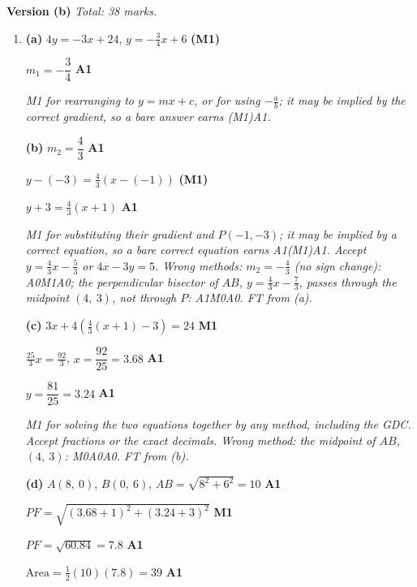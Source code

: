 \documentclass[12pt, twoside]{article}
\begin{document}
\newpage

\textbf{\large Version (b)} \hfill \emph{Total: 38 marks.}

\begin{enumerate}[itemsep=0.3cm]

\item[1.] [Maximum mark: 12]

\textbf{(a)} $4y = -3x + 24$, \quad $y = -\frac{3}{4}x + 6$ \hfill \textbf{(M1)}

$m_{1} = -\dfrac{3}{4}$ \hfill \textbf{A1}

\emph{M1 for rearranging to $y = mx + c$, or for using $-\frac{a}{b}$; it
may be implied by the correct gradient, so a bare answer earns (M1)A1.}

\textbf{(b)} $m_{2} = \dfrac{4}{3}$ \hfill \textbf{A1}

$y - (-3) = \frac{4}{3}\left(x - (-1)\right)$ \hfill \textbf{(M1)}

$y + 3 = \frac{4}{3}(x + 1)$ \hfill \textbf{A1}

\emph{M1 for substituting their gradient and $P(-1, -3)$; it may be
implied by a correct equation, so a bare correct equation earns
A1(M1)A1. Accept $y = \frac{4}{3}x - \frac{5}{3}$ or $4x - 3y = 5$. Wrong
methods: $m_{2} = -\frac{4}{3}$ (no sign change): A0M1A0; the perpendicular
bisector of $AB$, $y = \frac{4}{3}x - \frac{7}{3}$, passes through the
midpoint $(4,\ 3)$, not through $P$: A1M0A0. FT from (a).}

\textbf{(c)} $3x + 4\left(\frac{4}{3}(x + 1) - 3\right) = 24$ \hfill \textbf{M1}

$\frac{25}{3}x = \frac{92}{3}$, \quad $x = \dfrac{92}{25} = 3.68$ \hfill \textbf{A1}

$y = \dfrac{81}{25} = 3.24$ \hfill \textbf{A1}

\emph{M1 for solving the two equations together by any method, including
the GDC. Accept fractions or the exact decimals. Wrong method: the midpoint
of $AB$, $(4,\ 3)$: M0A0A0. FT from (b).}

\textbf{(d)} $A(8,\ 0)$, $B(0,\ 6)$, \quad $AB = \sqrt{8^{2} + 6^{2}} = 10$ \hfill \textbf{A1}

$PF = \sqrt{(3.68 + 1)^{2} + (3.24 + 3)^{2}}$ \hfill \textbf{M1}

$PF = \sqrt{60.84} = 7.8$ \hfill \textbf{A1}

$\text{Area} = \frac{1}{2}(10)(7.8) = 39$ \hfill \textbf{A1}


\end{enumerate}
\end{document}
